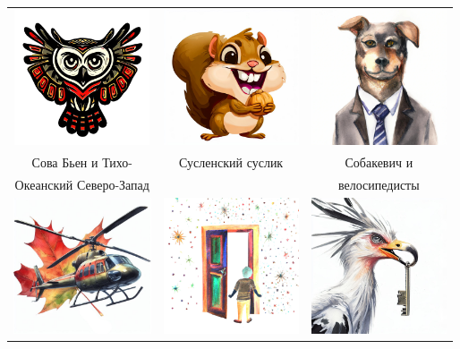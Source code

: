 \documentclass[a5paper,11pt]{memoir}
\begin{document}
\begin{table}[h]
\begin{tabular}{ccc}
\includegraphics[height=4cm]{images/cava-bien} & \includegraphics[height=4cm]{images/suslik} & \includegraphics[height=4cm]{images/sobachevich}             \\
 Сова Бьен и Тихо-  &  Сусленский суслик        &   Собакевич и            \\
 Океанский Северо-Запад           &          &    велосипедисты          \\
\includegraphics[height=4cm]{images/maple-chopper} & \includegraphics[height=4cm]{images/cosmoroom.jpeg} & \includegraphics[height=4cm]{images/secretary-key-2}             \\

\end{tabular}
\end{table}
\end{document}
